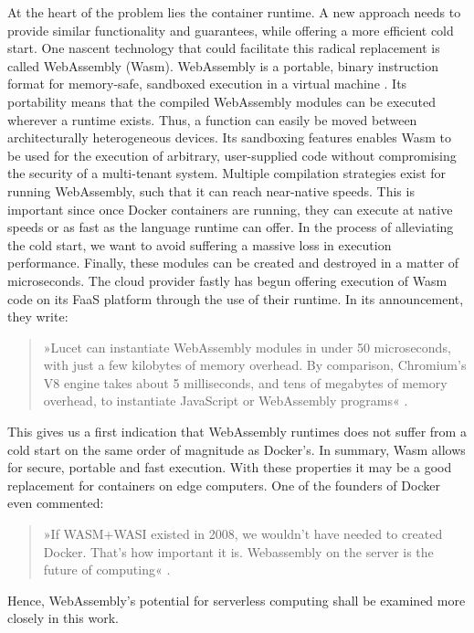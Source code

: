 At the heart of the problem lies the container runtime. A new approach needs to provide similar functionality and guarantees, while offering a more efficient cold start. One nascent technology that could facilitate this radical replacement is called WebAssembly (Wasm).
WebAssembly is a portable, binary instruction format for memory-safe, sandboxed execution in a virtual machine \cite{W3C2020}. Its portability means that the compiled WebAssembly modules can be executed wherever a runtime exists.
Thus, a function can easily be moved between architecturally heterogeneous devices. Its sandboxing features enables Wasm to be used for the execution of arbitrary, user-supplied code without compromising the security of a multi-tenant system. Multiple compilation strategies exist for running WebAssembly, such that it can reach near-native speeds. This is important since once Docker containers are running, they can execute at native speeds or as fast as the language runtime can offer. In the process of alleviating the cold start, we want to avoid suffering a massive loss in execution performance. Finally, these modules can be created and destroyed in a matter of microseconds. The cloud provider fastly has begun offering execution of Wasm code on its FaaS platform through the use of their  runtime. In its announcement, they write:

\begin{quote}
  »Lucet can instantiate WebAssembly modules in under 50 microseconds, with just a few kilobytes of memory overhead. By comparison, Chromium’s V8 engine takes about 5 milliseconds, and tens of megabytes of memory overhead, to instantiate JavaScript or WebAssembly programs« \cite{fastly2019}.
\end{quote}

This gives us a first indication that WebAssembly runtimes does not suffer from a cold start on the same order of magnitude as Docker's.
In summary, Wasm allows for secure, portable and fast execution. With these properties it may be a good replacement for containers on edge computers. One of the founders of Docker even commented:

\begin{quote}
  »If WASM+WASI existed in 2008, we wouldn't have needed to created Docker. That's how important it is. Webassembly on the server is the future of computing« \cite{Hykes2019}.
\end{quote}

Hence, WebAssembly's potential for serverless computing shall be examined more closely in this work.

